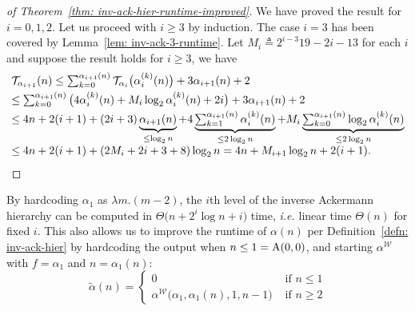 \begin{proof}[of Theorem~\ref{thm: inv-ack-hier-runtime-improved}]
	We have proved the result for $i = 0, 1, 2$. Let us proceed with $i\ge 3$ by induction. The case $i = 3$ has been covered by Lemma~\ref{lem: inv-ack-3-runtime}. Let $M_i \triangleq 2^{i-3}19 - 2i - 13$ for each $i$ and suppose the result holds for $i\ge 3$, we have
	\begin{equation*}
	\begin{array}{@{}l@{}}
	 \runtime_{\alpha_{i+1}}(n) \le \sum_{k=0}^{\alpha_{i+1}(n)} \runtime_{\alpha_i}\big(\alpha_i^{(k)}(n)\big) + 3\alpha_{i+1}(n) + 2 \\[3pt]
	\le \sum_{k=0}^{\alpha_{i+1}(n)}\big(4\alpha_i^{(k)}(n) + M_i\log_2\alpha_i^{(k)}(n) + 2i \big) + 3\alpha_{i+1}(n) + 2 \\[3pt]
  \le 4n + 2(i+1) + (2i + 3)\underbrace{\alpha_{i+1}(n)}_{\le \log_2n} + 4\underbrace{\textstyle \sum_{k=1}^{\alpha_{i+1}(n)}\alpha_i^{(k)}(n)}_{\le 2\log_2n} + M_i\underbrace{\textstyle \sum_{k=0}^{\alpha_{i+1}(n)}\log_2\alpha_i^{(k)}(n)}_{\le 2\log_2n} \\[3pt]
	\le 4n + 2(i+1) + (2M_i + 2i + 3 + 8)\log_2n
	= 4n + M_{i+1}\log_2n + 2(i+1).
	\end{array}
	\end{equation*}
\end{proof}
By hardcoding $\alpha_1$ as $\lambda m.(m-2)$, the $i$th level of the inverse Ackermann hierarchy can be computed in $\Theta\big(n + 2^i\log n  + i\big)$ time, \emph{i.e.} linear time $\Theta(n)$ for fixed $i$.
This also allows us to improve the runtime of $\alpha(n)$ per Definition~\ref{defn: inv-ack-hier} by hardcoding the output when $n\le 1 = \text{A}(0, 0)$, and starting $\alpha^{\mathcal{W}}$ with $f = \alpha_1$ and $n = \alpha_1(n)$:
\begin{equation*}
\tilde{\alpha}(n) = \begin{cases}
0 & \text{ if } n \le 1 \\ \alpha^{\mathcal{W}}\big(\alpha_1, \alpha_1(n), 1, n-1\big) & \text{ if } n \ge 2
\end{cases}
\end{equation*}
